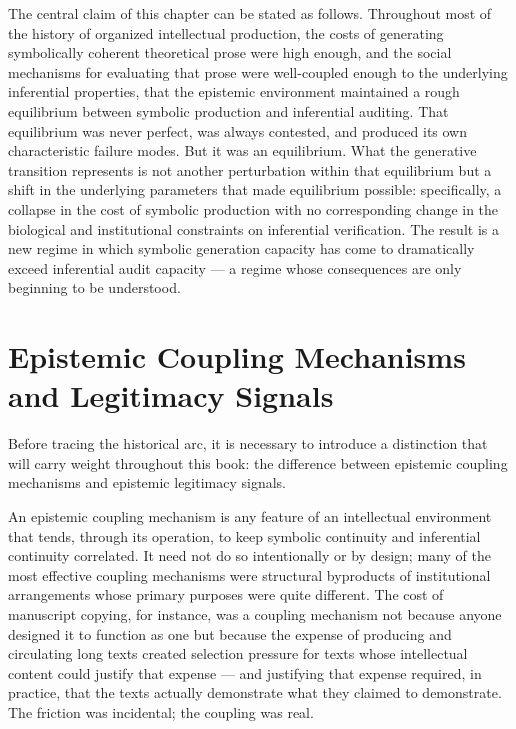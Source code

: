 \documentclass[12pt, openright, twoside]{book}
\begin{document}
The central claim of this chapter can be stated as follows. Throughout most of
the history of organized intellectual production, the costs of generating
symbolically coherent theoretical prose were high enough, and the social
mechanisms for evaluating that prose were well-coupled enough to the underlying
inferential properties, that the epistemic environment maintained a rough
equilibrium between symbolic production and inferential auditing. That
equilibrium was never perfect, was always contested, and produced its own
characteristic failure modes. But it was an equilibrium. What the generative
transition represents is not another perturbation within that equilibrium but
a shift in the underlying parameters that made equilibrium possible: specifically,
a collapse in the cost of symbolic production with no corresponding change in
the biological and institutional constraints on inferential verification. The
result is a new regime in which symbolic generation capacity has come to
dramatically exceed inferential audit capacity --- a regime whose consequences
are only beginning to be understood.

\section{Epistemic Coupling Mechanisms and Legitimacy Signals}

Before tracing the historical arc, it is necessary to introduce a distinction
that will carry weight throughout this book: the difference between epistemic
coupling mechanisms and epistemic legitimacy signals.

An epistemic coupling mechanism is any feature of an intellectual environment
that tends, through its operation, to keep symbolic continuity and inferential
continuity correlated. It need not do so intentionally or by design; many of
the most effective coupling mechanisms were structural byproducts of
institutional arrangements whose primary purposes were quite different. The
cost of manuscript copying, for instance, was a coupling mechanism not because
anyone designed it to function as one but because the expense of producing and
circulating long texts created selection pressure for texts whose intellectual
content could justify that expense --- and justifying that expense required,
in practice, that the texts actually demonstrate what they claimed to
demonstrate. The friction was incidental; the coupling was real.
\end{document}
